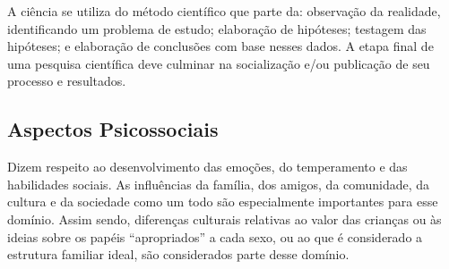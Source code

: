 A ciência se utiliza do método científico que parte da: observação da realidade, identificando um problema de estudo; elaboração de hipóteses; testagem das hipóteses; e elaboração de conclusões com base nesses dados. A etapa final de uma pesquisa científica deve culminar na socialização e/ou publicação de seu processo e resultados.

\subsection{Aspectos Psicossociais}

Dizem respeito ao desenvolvimento das emoções, do temperamento e das habilidades sociais. As influências da família, dos amigos, da comunidade, da cultura e da sociedade como um todo são especialmente importantes para esse domínio. Assim sendo, diferenças culturais relativas ao valor das crianças ou às ideias sobre os papéis “apropriados” a cada sexo, ou ao que é considerado a estrutura familiar ideal, são considerados parte desse domínio.

